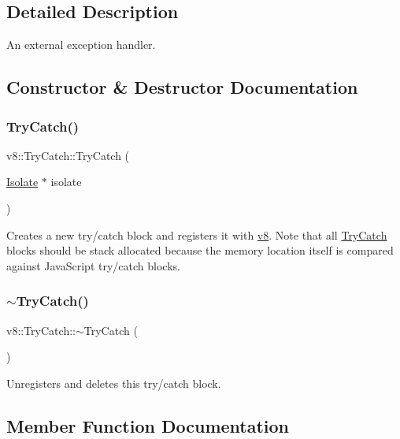 \subsection{Detailed Description}
An external exception handler. 

\subsection{Constructor \& Destructor Documentation}
\mbox{\label{classv8_1_1TryCatch_a623ce624491b383fae60c05d2aeefb1a}} 
\subsubsection{\texorpdfstring{Try\+Catch()}{TryCatch()}}
{\footnotesize\ttfamily v8\+::\+Try\+Catch\+::\+Try\+Catch (\begin{DoxyParamCaption}\item[{\mbox{\hyperlink{classv8_1_1Isolate}{Isolate}} $\ast$}]{isolate }\end{DoxyParamCaption})\hspace{0.3cm}{\ttfamily [explicit]}}

Creates a new try/catch block and registers it with \mbox{\hyperlink{namespacev8}{v8}}. Note that all \mbox{\hyperlink{classv8_1_1TryCatch}{Try\+Catch}} blocks should be stack allocated because the memory location itself is compared against Java\+Script try/catch blocks. \mbox{\label{classv8_1_1TryCatch_a2c9ad4b40d17dd31c6dd020736b30679}} 
\subsubsection{\texorpdfstring{$\sim$\+Try\+Catch()}{~TryCatch()}}
{\footnotesize\ttfamily v8\+::\+Try\+Catch\+::$\sim$\+Try\+Catch (\begin{DoxyParamCaption}{ }\end{DoxyParamCaption})}

Unregisters and deletes this try/catch block. 

\subsection{Member Function Documentation}
\mbox{\label{classv8_1_1TryCatch_ae94d0f0d695dbfecbfcdeb48716b367f}} 
